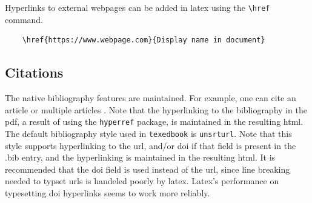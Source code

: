 \documentclass{article}
\begin{document}
Hyperlinks to external webpages can be added in latex using the \verb'\href' command.
\begin{verbatim}
    \href{https://www.webpage.com}{Display name in document}
\end{verbatim}

\subsection{Citations}
The native bibliography features are maintained. For example, one can cite an article \cite{Hanus2021} or multiple articles \cite{Hanus2019,Hanus2021,Gregory2021}. Note that the hyperlinking to the bibliography in the pdf, a result of using the \verb'hyperref' package, is maintained in the resulting html. The default bibliography style used in \verb'texedbook' is \verb'unsrturl'. Note that this style supports hyperlinking to the url, and/or doi if that field is present in the .bib entry, and the hyperlinking is maintained in the resulting html. It is recommended that the doi field is used instead of the url, since line breaking needed to typset urls is handeled poorly by latex. Latex's performance on typesetting doi hyperlinks seems to work more reliably.



\end{document}
